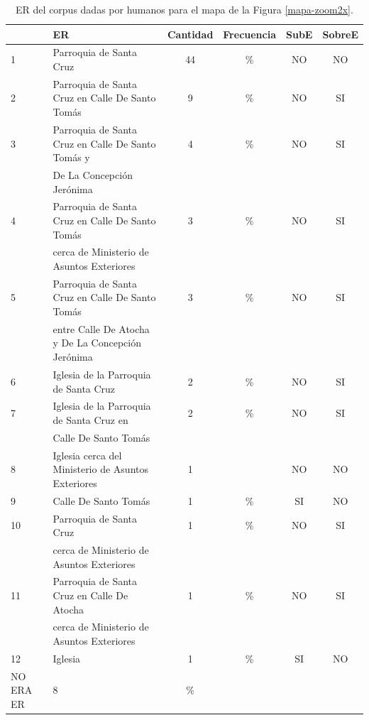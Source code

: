 \begin{table}[H]
{\footnotesize
\begin{center}
\begin{tabular}{|l|l|c|c|c|c|}
\hline
&ER 					      & Cantidad &  Frecuencia & SubE&SobreE \\ \hline \hline
1&Parroquia de Santa Cruz        												 &		44&	\%  & NO &NO \\ \hline
2&Parroquia de Santa Cruz en Calle De Santo Tom\'as        &    9 &	\%	& NO&SI\\ \hline
3&Parroquia de Santa Cruz en Calle De Santo Tom\'as y      &    4 &     \%      & NO&SI\\
&De La Concepci\'on Jer\'onima                             &      &             & & \\ \hline
4&Parroquia de Santa Cruz en Calle De Santo Tom\'as        &    3 &     \%      &NO&SI\\
&cerca de Ministerio de Asuntos Exteriores                 &      &             & &\\  \hline
5&Parroquia de Santa Cruz en Calle De Santo Tom\'as        &	3 &	\%	& NO&SI\\
&entre Calle De Atocha y De La Concepci\'on Jer\'onima     &	  &			&  &\\  \hline
6&Iglesia de la Parroquia de Santa Cruz			   &	2 &	\%	&NO&SI\\  \hline
7&Iglesia de la Parroquia de Santa Cruz	en      	   &	2 &	\%	&NO&SI\\  
&Calle De Santo Tom\'as													 				 &		 &	    &  & \\ \hline
8&Iglesia cerca del Ministerio de Asuntos Exteriores       &	1 &		&NO&NO\\  \hline
9&Calle De Santo Tom\'as                                   &    1 &     \%      &SI&NO\\  \hline

10&Parroquia de Santa Cruz  				   &    1 &	\%	&NO&SI\\  
&cerca de Ministerio de Asuntos Exteriores		   &	  &		&&\\  \hline
11&Parroquia de Santa Cruz en Calle De Atocha  		   &	1 &	\%	&NO&SI\\  
&cerca de Ministerio de Asuntos Exteriores		   &	  &		&&\\  \hline
12&Iglesia						   &    1 &	\%	&SI&NO\\  \hline
NO ERA ER				   		   &	8 &	\%	& &\\  \hline
\hline
\end{tabular}
\caption{ER del corpus dadas por humanos para el mapa de la Figura \ref{mapa-zoom2x}.}\label{freq-mapa-zoom2x}
\end{center}
}
\end{table}


